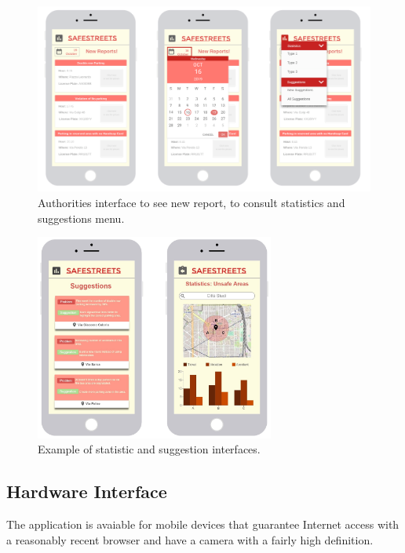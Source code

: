 \documentclass{report}
\begin{document}
\begin{figure}[!ht]
	\begin{center}
	\includegraphics[width=\textwidth]{img/NewReportcutted.png}
	\end{center}
	\caption{Authorities interface to see new report, to consult statistics and suggestions menu.}
	\vfill
\end{figure}
\clearpage
\begin{figure}[!ht]
	\begin{center}
	\includegraphics[width=0.7\textwidth]{img/StatisticsInterfaces.jpg}
	\end{center}
	\caption{Example of statistic and suggestion interfaces.}
\end{figure}

\subsection{Hardware Interface}
The application is avaiable for mobile devices that guarantee Internet access with a reasonably recent browser and have a camera with a fairly high definition.
\end{document}
